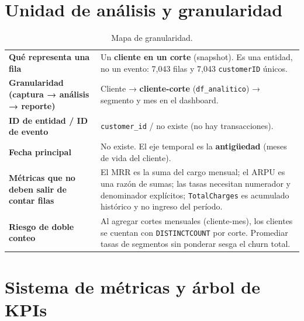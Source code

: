 \documentclass[10.5pt,a4paper]{article}
\begin{document}
\section{Unidad de análisis y granularidad}
\begin{table}[H]
\centering\footnotesize
\caption{Mapa de granularidad.}
\begin{tabularx}{\textwidth}{@{}>{\bfseries}P{4.2cm}X@{}}
\toprule
Qué representa una fila & Un \textbf{cliente en un corte} (snapshot). Es una entidad, no un evento: 7,043 filas y 7,043 \texttt{customerID} únicos. \\
Granularidad (captura → análisis → reporte) & Cliente → \textbf{cliente-corte} (\texttt{df\_analitico}) → segmento y mes en el dashboard. \\
ID de entidad / ID de evento & \texttt{customer\_id} / no existe (no hay transacciones). \\
Fecha principal & No existe. El eje temporal es la \textbf{antigüedad} (meses de vida del cliente). \\
Métricas que no deben salir de contar filas & El MRR es la suma del cargo mensual; el ARPU es una razón de sumas; las tasas necesitan numerador y denominador explícitos; \texttt{TotalCharges} es acumulado histórico y no ingreso del período. \\
Riesgo de doble conteo & Al agregar cortes mensuales (cliente-mes), los clientes se cuentan con \texttt{DISTINCTCOUNT} por corte. Promediar tasas de segmentos sin ponderar sesga el churn total. \\
\bottomrule
\end{tabularx}
\end{table}

\section{Sistema de métricas y árbol de KPIs}
\end{document}
